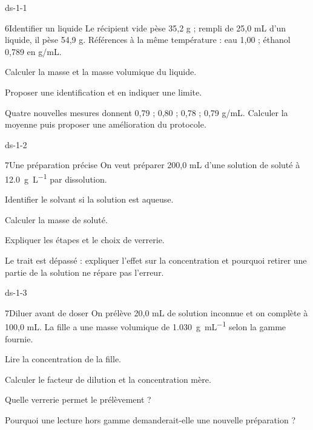 \begin{blocLivre}{ds-1-1}\begin{exoBac}{6}{Identifier un liquide}
Le récipient vide pèse 35,2 g ; rempli de 25,0 mL d’un liquide, il pèse 54,9 g. Références à la même température : eau 1,00 ; éthanol 0,789 en g/mL.
\begin{questions}
\item Calculer la masse et la masse volumique du liquide.
\item Proposer une identification et en indiquer une limite.
\item Quatre nouvelles mesures donnent 0,79 ; 0,80 ; 0,78 ; 0,79 g/mL. Calculer la moyenne puis proposer une amélioration du protocole.
\end{questions}
\end{exoBac}\end{blocLivre}
\begin{blocLivre}{ds-1-2}\begin{exoBac}{7}{Une préparation précise}
On veut préparer 200,0 mL d’une solution de soluté à \qty{12,0}{g.L^{-1}} par dissolution.
\begin{questions}
\item Identifier le solvant si la solution est aqueuse.
\item Calculer la masse de soluté.
\item Expliquer les étapes et le choix de verrerie.
\item Le trait est dépassé : expliquer l’effet sur la concentration et pourquoi retirer une partie de la solution ne répare pas l’erreur.
\end{questions}
\end{exoBac}\end{blocLivre}
\begin{blocLivre}{ds-1-3}\begin{exoBac}{7}{Diluer avant de doser}
On prélève 20,0 mL de solution inconnue et on complète à 100,0 mL. La fille a une masse volumique de \qty{1,030}{g.mL^{-1}} selon la gamme fournie.
\begin{questions}
\item Lire la concentration de la fille.
\item Calculer le facteur de dilution et la concentration mère.
\item Quelle verrerie permet le prélèvement ?
\item Pourquoi une lecture hors gamme demanderait-elle une nouvelle préparation ?
\end{questions}
\end{exoBac}\end{blocLivre}

